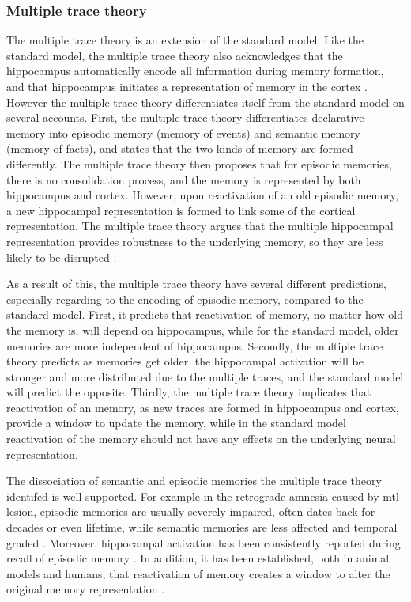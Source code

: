 \subsubsection{Multiple trace theory \label{hpc-mtt}}
The multiple trace theory is an extension of the standard model. Like the standard model, the multiple trace theory also acknowledges that the hippocampus automatically encode all information during memory formation, and that hippocampus initiates a representation of memory in the cortex \citep{nadel97}. However the multiple trace theory differentiates itself from the standard model on several accounts. First, the multiple trace theory differentiates declarative memory into episodic memory (memory of events) and semantic memory (memory of facts), and states that the two kinds of memory are formed differently. The multiple trace theory then proposes that for episodic memories, there is no consolidation process, and the memory is represented by both hippocampus and cortex. However, upon reactivation of an old episodic memory, a new hippocampal representation is formed to link some of the cortical representation. The multiple trace theory argues that the multiple hippocampal representation provides robustness to the underlying memory, so they are less likely to be disrupted \citep{nadel97}. 

As a result of this, the multiple trace theory have several different predictions, especially regarding to the encoding of episodic memory, compared to the standard model. First, it predicts that reactivation of memory, no matter how old the memory is, will  depend on hippocampus, while for the standard model, older memories are more independent of hippocampus. Secondly, the multiple trace theory predicts as memories get older, the hippocampal activation will be stronger and more distributed due to the multiple traces, and the standard model will predict the opposite. Thirdly, the multiple trace theory implicates that reactivation of an memory, as new traces are formed in hippocampus and cortex, provide a window to update the memory, while in the standard model reactivation of the memory should not have any effects on the underlying neural representation. 

The dissociation of semantic and episodic memories the multiple trace theory identifed is well supported. For example in the retrograde amnesia caused by \gls{mtl} lesion, episodic memories are usually severely impaired, often dates back for decades or even lifetime, while semantic memories are less affected and temporal graded \citep{kapur97, vargha-khadem97, moscovitch05}. Moreover, hippocampal activation has been consistently reported during recall of episodic memory \citep{maguire01, svoboda06}. In addition, it has been established, both in animal models and humans, that reactivation of memory creates a window to alter the original memory representation \citep{wang10, dunbar16}.

